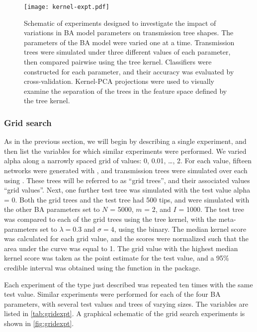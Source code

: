 \begin{figure}[ht]
  \centering
  \texttt{[image: kernel-expt.pdf]}
  \caption[Schematic of experiments investigating impact of BA model parameters
           on tree shape.]{
    Schematic of experiments designed to investigate the impact of variations
    in BA model parameters on transmission tree shapes. The parameters of the
    BA model were varied one at a time. Transmission trees were simulated under
    three different values of each parameter, then compared pairwise using the
    tree kernel. Classifiers were constructed for each parameter, and their
    accuracy was evaluated by cross-validation. Kernel-PCA projections were
    used to visually examine the separation of the trees in the feature space
    defined by the tree kernel.
  }
  \label{fig:kernelexpt}
\end{figure}

\subsubsection*{Grid search}

As in the previous section, we will begin by describing a single experiment,
and then list the variables for which similar experiments were performed. We
varied \gls{alpha} along a narrowly spaced grid of values: 0, 0.01, \ldots, 2.
For each value, fifteen networks were generated with , and
transmission trees were simulated over each using . These
trees will be referred to as ``grid trees'', and their associated values ``grid
values''. Next, one further test tree was simulated with the test value
\gls{alpha} = 0. Both the grid trees and the test tree had 500 tips, and were
simulated with the other \gls{BA} parameters set to $N$ = 5000, $m$ = 2, and
$I$ = 1000. The test tree was compared to each of the grid trees using the tree
kernel, with the meta-parameters set to $\lambda = 0.3$ and $\sigma = 4$, using
the  binary. The median kernel score was calculated for
each grid value, and the scores were normalized such that the area under the
curve was equal to 1. The grid value with the highest median kernel score was
taken as the point estimate for the test value, and a 95\% credible interval
was obtained using the  function in the 
package.

Each experiment of the type just described was repeated ten times with the same
test value. Similar experiments were performed for each of the four \gls{BA}
parameters, with several test values and trees of varying sizes. The variables
are listed in \cref{tab:gridexpt}. A graphical schematic of the grid search
experiments is shown in \cref{fig:gridexpt}.

